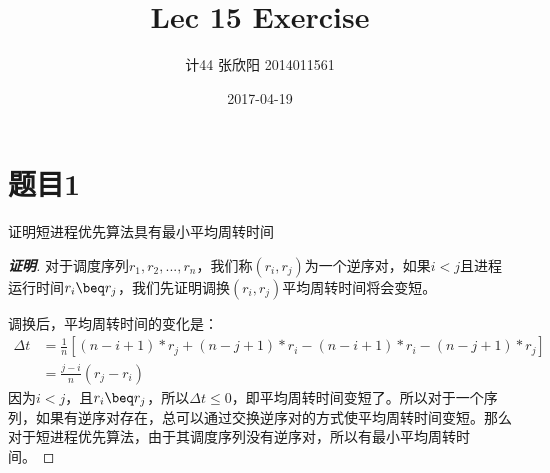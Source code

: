 \documentclass[a4paper]{article}
\title{Lec 15 Exercise}
\author{
        计44 张欣阳 2014011561
}
\date{2017-04-19}
\begin{document}
\maketitle

\section*{题目1}
证明短进程优先算法具有最小平均周转时间

\begin{proof}[\textbf{证明}]
    对于调度序列$r_1, r_2, ..., r_n$，我们称$(r_i, r_j)$为一个逆序对，如果$i < j$且进程运行时间$r_i \beq r_j$，我们先证明调换$(r_i, r_j)$平均周转时间将会变短。

    调换后，平均周转时间的变化是：
    \begin{align*}
        \Delta t &= \frac{1}{n}[(n-i+1)*r_j + (n-j+1)*r_i - (n-i+1)*r_i - (n-j+1)*r_j]\\
        &= \frac{j-i}{n}(r_j-r_i)
    \end{align*}
    因为$i<j$，且$r_i \beq r_j$，所以$\Delta t \leq 0$，即平均周转时间变短了。所以对于一个序列，如果有逆序对存在，总可以通过交换逆序对的方式使平均周转时间变短。那么对于短进程优先算法，由于其调度序列没有逆序对，所以有最小平均周转时间。

\end{proof}
\end{document}

